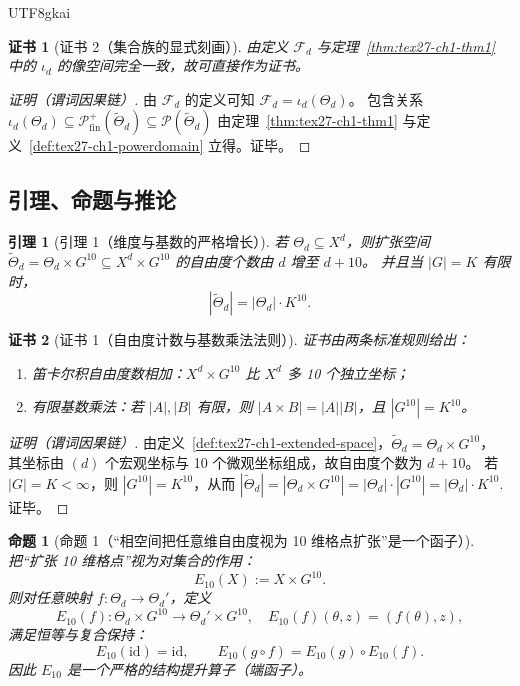 \documentclass[12pt]{article}
\newtheorem{proposition}{命题}[section]
\newtheorem{lemma}{引理}[section]
\newtheorem{Certificate}{证书}[section]
\newcommand{\PP}{\mathcal{P}}
\begin{document}
\begin{CJK*}{UTF8}{gkai}
\begin{Certificate}[证书 2（集合族的显式刻画）]
\label{cert:tex27-ch1-thm2}
由定义 $\mathcal{F}_d$ 与定理~\ref{thm:tex27-ch1-thm1} 中的 $\iota_d$ 的像空间完全一致，故可直接作为证书。
\end{Certificate}

\begin{proof}[证明（谓词因果链）]
由 $\mathcal{F}_d$ 的定义可知 $\mathcal{F}_d=\iota_d(\Theta_d)$。
包含关系 $\iota_d(\Theta_d)\subseteq \PP_{\mathrm{fin}}^{+}(\widetilde{\Theta}_d)\subseteq \PP(\widetilde{\Theta}_d)$
由定理~\ref{thm:tex27-ch1-thm1} 与定义~\ref{def:tex27-ch1-powerdomain} 立得。证毕。
\end{proof}

\subsection{引理、命题与推论}
\label{subsec:tex27-ch1-others}

\begin{lemma}[引理 1（维度与基数的严格增长）]
\label{lem:tex27-ch1-lem1}
若 $\Theta_d\subseteq X^d$，则扩张空间 $\widetilde{\Theta}_d=\Theta_d\times G^{10}\subseteq X^d\times G^{10}$ 的自由度个数由 $d$ 增至
  $d+10$。
并且当 $|G|=K$ 有限时，
\[
  |\widetilde{\Theta}_d| = |\Theta_d|\cdot K^{10}.
\]
\end{lemma}

\begin{Certificate}[证书 1（自由度计数与基数乘法法则）]
\label{cert:tex27-ch1-lem1}
证书由两条标准规则给出：
\begin{enumerate}
  \item 笛卡尔积自由度数相加：$X^d\times G^{10}$ 比 $X^d$ 多 10 个独立坐标；
  \item 有限基数乘法：若 $|A|,|B|$ 有限，则 $|A\times B|=|A||B|$，且 $|G^{10}|=K^{10}$。
\end{enumerate}
\end{Certificate}

\begin{proof}[证明（谓词因果链）]
由定义~\ref{def:tex27-ch1-extended-space}，$\widetilde{\Theta}_d=\Theta_d\times G^{10}$，
其坐标由 $(d)$ 个宏观坐标与 10 个微观坐标组成，故自由度个数为 $d+10$。
若 $|G|=K<\infty$，则 $|G^{10}|=K^{10}$，从而
$
|\widetilde{\Theta}_d|
=|\Theta_d\times G^{10}|
=|\Theta_d|\cdot |G^{10}|
=|\Theta_d|\cdot K^{10}.
$
证毕。
\end{proof}

\begin{proposition}[命题 1（“相空间把任意维自由度视为 10 维格点扩张”是一个函子）]
\label{prop:tex27-ch1-prop1}
把“扩张 10 维格点”视为对集合的作用：
\[
  E_{10}(X):=X\times G^{10}.
\]
则对任意映射 $f:\Theta_d\to\Theta_d'$，定义
\[
  E_{10}(f):\Theta_d\times G^{10}\to\Theta_d'\times G^{10},\quad
  E_{10}(f)(\theta,z)=(f(\theta),z),
\]
满足恒等与复合保持：
\[
  E_{10}(\mathrm{id})=\mathrm{id},\qquad
  E_{10}(g\circ f)=E_{10}(g)\circ E_{10}(f).
\]
因此 $E_{10}$ 是一个严格的结构提升算子（端函子）。
\end{proposition}


\end{CJK*}
\end{document}
